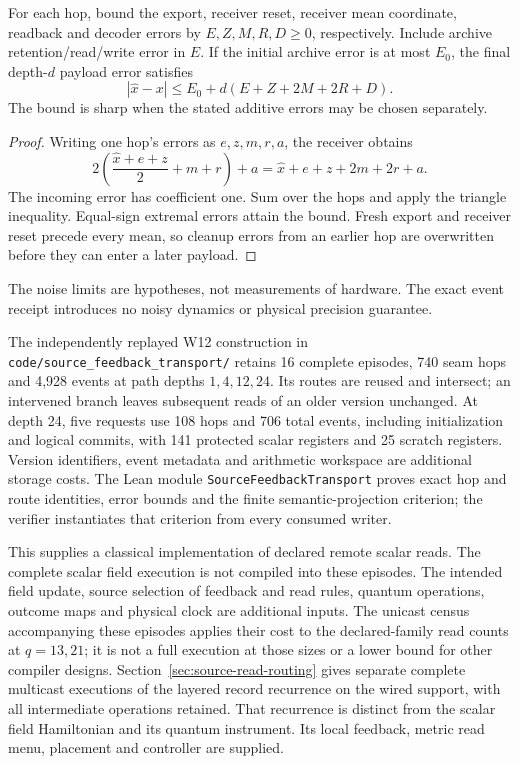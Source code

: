 \begin{theorem}
\label{thm:source-feedback-error}
For each hop, bound the export, receiver reset, receiver mean coordinate,
readback and decoder errors by $E,Z,M,R,D\geq0$, respectively. Include
archive retention/read/write error in $E$. If the initial archive error is
at most $E_0$, the final depth-$d$ payload error satisfies
\[
 |\widehat x-x|\leq E_0+d(E+Z+2M+2R+D).
\]
The bound is sharp when the stated additive errors may be chosen separately.
\end{theorem}
\begin{proof}
Writing one hop's errors as $e,z,m,r,a$, the receiver obtains
\[
 2\left(\frac{\widehat x+e+z}{2}+m+r\right)+a
 =\widehat x+e+z+2m+2r+a.
\]
The incoming error has coefficient one. Sum over the hops and apply the
triangle inequality. Equal-sign extremal errors attain the bound.
Fresh export and receiver reset precede every mean, so cleanup errors from
an earlier hop are overwritten before they can enter a later payload.
\end{proof}
The noise limits are hypotheses, not measurements of hardware. The exact
event receipt introduces no noisy dynamics or physical precision guarantee.

The independently replayed W12 construction in
\texttt{code/source\_feedback\_transport/} retains 16 complete episodes,
740 seam hops and 4,928 events at path depths $1,4,12,24$. Its routes are
reused and intersect; an intervened branch leaves subsequent reads of an
older version unchanged. At depth 24, five requests use 108 hops and 706
total events, including initialization and logical commits, with 141
protected scalar registers and 25 scratch registers. Version identifiers,
event metadata and arithmetic workspace are additional storage costs.
The Lean module \texttt{SourceFeedbackTransport} proves exact hop and route
identities, error bounds and the finite semantic-projection criterion; the
verifier instantiates that criterion from every consumed writer.

This supplies a classical implementation of declared remote scalar reads.
The complete scalar field execution is not compiled into these episodes.
The intended field update, source selection of feedback and read rules,
quantum operations, outcome maps and physical clock are additional inputs.
The unicast census accompanying these episodes applies their cost to the
declared-family read counts at $q=13,21$; it is not a full execution at
those sizes or a lower bound for other compiler designs.
Section~\ref{sec:source-read-routing} gives separate complete multicast
executions of the layered record recurrence on the wired support, with
all intermediate operations retained. That recurrence is distinct from
the scalar field Hamiltonian and its quantum instrument. Its local
feedback, metric read menu, placement and controller are supplied.
